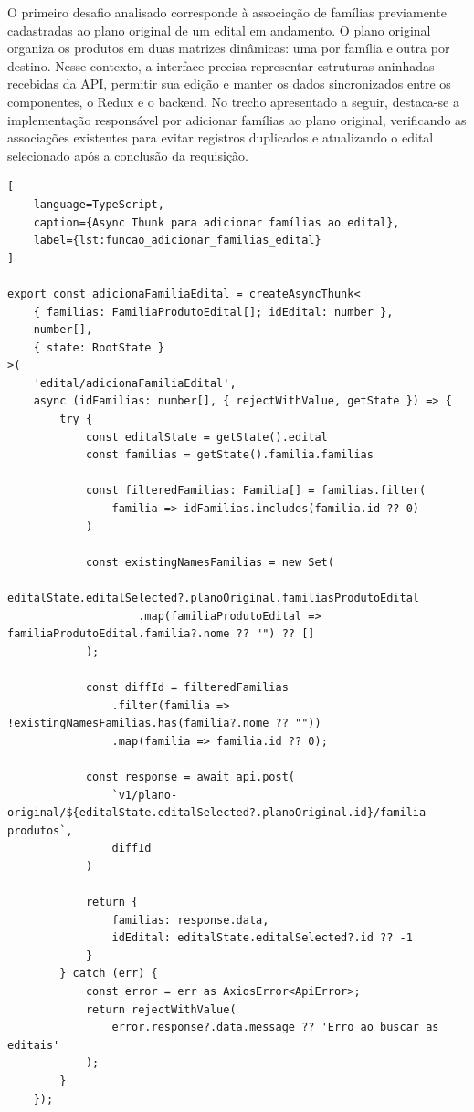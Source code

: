 O primeiro desafio analisado corresponde à associação de famílias previamente cadastradas ao plano original de um edital em andamento. O plano original organiza os produtos em duas matrizes dinâmicas: uma por família e outra por destino. Nesse contexto, a interface precisa representar estruturas aninhadas recebidas da API, permitir sua edição e manter os dados sincronizados entre os componentes, o Redux e o backend. No trecho apresentado a seguir, destaca-se a implementação responsável por adicionar famílias ao plano original, verificando as associações existentes para evitar registros duplicados e atualizando o edital selecionado após a conclusão da requisição.

\begin{lstlisting}[
    language=TypeScript,
    caption={Async Thunk para adicionar famílias ao edital},
    label={lst:funcao_adicionar_familias_edital}
]

export const adicionaFamiliaEdital = createAsyncThunk<
    { familias: FamiliaProdutoEdital[]; idEdital: number },
    number[],
    { state: RootState }
>(
    'edital/adicionaFamiliaEdital',
    async (idFamilias: number[], { rejectWithValue, getState }) => {
        try {
            const editalState = getState().edital
            const familias = getState().familia.familias

            const filteredFamilias: Familia[] = familias.filter(
                familia => idFamilias.includes(familia.id ?? 0)
            )

            const existingNamesFamilias = new Set(
                editalState.editalSelected?.planoOriginal.familiasProdutoEdital
                    .map(familiaProdutoEdital => familiaProdutoEdital.familia?.nome ?? "") ?? []
            );

            const diffId = filteredFamilias
                .filter(familia => !existingNamesFamilias.has(familia?.nome ?? ""))
                .map(familia => familia.id ?? 0);

            const response = await api.post(
                `v1/plano-original/${editalState.editalSelected?.planoOriginal.id}/familia-produtos`,
                diffId
            )

            return {
                familias: response.data,
                idEdital: editalState.editalSelected?.id ?? -1
            }
        } catch (err) {
            const error = err as AxiosError<ApiError>;
            return rejectWithValue(
                error.response?.data.message ?? 'Erro ao buscar as editais'
            );
        }
    });

\end{lstlisting}

